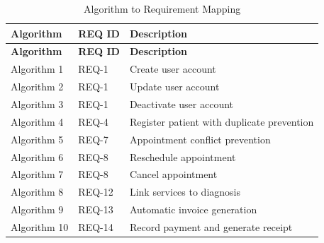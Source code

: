  \begin{longtable}{|p{3cm}|p{3cm}|p{8cm}|}
 	\caption{Algorithm to Requirement Mapping} \label{tab:algo-trace} \\
 	\hline
 	\textbf{Algorithm} & \textbf{REQ ID} & \textbf{Description} \\
 	\hline
 	\endfirsthead
 	\hline
 	\textbf{Algorithm} & \textbf{REQ ID} & \textbf{Description} \\
 	\hline
 	\endhead
 	\hline
 	\endfoot
 	Algorithm 1 & REQ-1 & Create user account \\
 	Algorithm 2 & REQ-1 & Update user account \\
 	Algorithm 3 & REQ-1 & Deactivate user account \\
 	Algorithm 4 & REQ-4 & Register patient with duplicate prevention \\
 	Algorithm 5 & REQ-7 & Appointment conflict prevention \\
 	Algorithm 6 & REQ-8 & Reschedule appointment \\
 	Algorithm 7 & REQ-8 & Cancel appointment \\
 	Algorithm 8 & REQ-12 & Link services to diagnosis \\
 	Algorithm 9 & REQ-13 & Automatic invoice generation \\
 	Algorithm 10 & REQ-14 & Record payment and generate receipt \\
 	\hline
 \end{longtable}